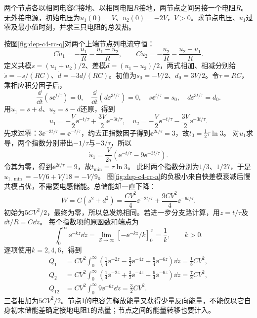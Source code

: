 \begin{example}[无电感电路中的反向电压]
两个节点各以相同电容$C$接地、以相同电阻$R$接地，两节点之间另接一个电阻$R$。无外接电源，初始电压为$u_1(0)=V$、$u_2(0)=-2V$，$V>0$。求节点电压、$u_1$过零及最小值时刻，并求三只电阻的总发热。
\end{example}
\begin{solution}
按图\ref{fig:dep-c4-rc-q}对两个上端节点列电流守恒：
\[
 C\dot u_1=-\frac{u_1}{R}-\frac{u_1-u_2}{R},\qquad
 C\dot u_2=-\frac{u_2}{R}-\frac{u_2-u_1}{R}.
\]
定义共模$s=(u_1+u_2)/2$、差模$d=(u_1-u_2)/2$，两式相加、相减分别给$\dot s=-s/(RC)$、$\dot d=-3d/(RC)$。初值为$s_0=-V/2$、$d_0=3V/2$。令$\tau=RC$，乘相应积分因子后，
\[
 \frac{\dd}{\dd t}(s\ee^{t/\tau})=0,\quad
 \frac{\dd}{\dd t}(d\ee^{3t/\tau})=0,
 \quad s\ee^{t/\tau}=s_0,\quad d\ee^{3t/\tau}=d_0.
\]
用$u_1=s+d$、$u_2=s-d$还原，得到
\[
 u_1=-\frac V2\ee^{-t/\tau}+\frac{3V}{2}\ee^{-3t/\tau},\quad
 u_2=-\frac V2\ee^{-t/\tau}-\frac{3V}{2}\ee^{-3t/\tau}.
\]
先求过零：$3\ee^{-3t/\tau}=\ee^{-t/\tau}$，约去正指数因子得到$\ee^{2t/\tau}=3$，故$t_0=\tfrac12\tau\ln3$。
对$u_1$求导，两个指数分别带出$-1/\tau$与$-3/\tau$，所以
\[
 \dot u_1=\frac{V}{2\tau}\left(\ee^{-t/\tau}-9\ee^{-3t/\tau}\right).
\]
令其为零，得到$\ee^{2t/\tau}=9$，故$t_{\min}=\tau\ln3$。
此时两个指数分别为$1/3$、$1/27$，于是$u_{1,\min}=-V/6+V/18=-V/9$。
图\ref{fig:dep-c4-rc-a}的负极小来自快差模衰减后慢共模占优，不需要电感储能。总储能却一直下降：
\[
 W=C(s^2+d^2)=\frac{CV^2}{4}\ee^{-2t/\tau}
 +\frac{9CV^2}{4}\ee^{-6t/\tau}.
\]
初始为$5CV^2/2$，最终为零，所以总发热相同。若进一步分支路计算，用$z=t/\tau$及$\dd t/R=C\dd z$。
每个指数项的原函数和端点为
\[
 \int_0^\infty\ee^{-kz}\dd z
 =\lim_{Z\to\infty}[-\ee^{-kz}/k]_0^Z=\frac1k,\qquad k>0.
\]
逐项使用$k=2,4,6$，得到
\begin{align*}
 Q_1&=CV^2\int_0^\infty
 (\tfrac14\ee^{-2z}-\tfrac32\ee^{-4z}+\tfrac94\ee^{-6z})\dd z
 =\frac18CV^2,\\
 Q_2&=CV^2\int_0^\infty
 (\tfrac14\ee^{-2z}+\tfrac32\ee^{-4z}+\tfrac94\ee^{-6z})\dd z
 =\frac78CV^2,\\
 Q_{12}&=CV^2\int_0^\infty9\ee^{-6z}\dd z=\frac32CV^2.
\end{align*}
三者相加为$5CV^2/2$。节点1的电容先释放能量又获得少量反向能量，不能仅以它自身初末储能差确定接地电阻1的热量；节点之间的能量转移也要计入。
\end{solution}

